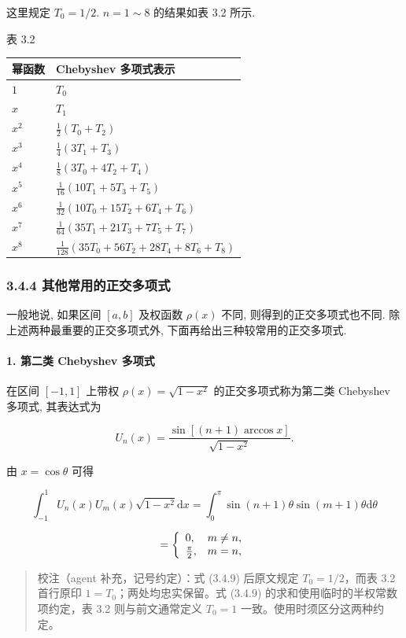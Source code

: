 这里规定 \(T_0 = 1/2\). \(n=1 \sim 8\) 的结果如表 3.2 所示.

表 3.2

{\def\LTcaptype{none} %
\begin{longtable}[]{@{}ll@{}}
\toprule\noalign{}
幂函数 & Chebyshev 多项式表示 \\
\midrule\noalign{}
\endhead
\bottomrule\noalign{}
\endlastfoot
\(1\) & \(T_0\) \\
\(x\) & \(T_1\) \\
\(x^2\) & \(\frac12(T_0+T_2)\) \\
\(x^3\) & \(\frac14(3T_1+T_3)\) \\
\(x^4\) & \(\frac18(3T_0+4T_2+T_4)\) \\
\(x^5\) & \(\frac1{16}(10T_1+5T_3+T_5)\) \\
\(x^6\) & \(\frac1{32}(10T_0+15T_2+6T_4+T_6)\) \\
\(x^7\) & \(\frac1{64}(35T_1+21T_3+7T_5+T_7)\) \\
\(x^8\) & \(\frac1{128}(35T_0+56T_2+28T_4+8T_6+T_8)\) \\
\end{longtable}
}

\subsubsection{3.4.4 其他常用的正交多项式}\label{ch03a-ux5176ux4ed6ux5e38ux7528ux7684ux6b63ux4ea4ux591aux9879ux5f0f}

一般地说, 如果区间 \([a,b]\) 及权函数 \(\rho(x)\) 不同, 则得到的正交多项式也不同. 除上述两种最重要的正交多项式外, 下面再给出三种较常用的正交多项式.

\paragraph{1. 第二类 Chebyshev 多项式}\label{ch03a-ux7b2cux4e8cux7c7b-chebyshev-ux591aux9879ux5f0f}

在区间 \([-1,1]\) 上带权 \(\rho(x) = \sqrt{1-x^2}\) 的正交多项式称为第二类 Chebyshev 多项式, 其表达式为

\[
U_n(x) = \frac{\sin[(n+1)\arccos x]}{\sqrt{1-x^2}}. \tag{3.4.10}
\]

由 \(x=\cos\theta\) 可得

\[
\int_{-1}^{1} U_n(x) U_m(x) \sqrt{1-x^2} \mathrm{d}x = \int_{0}^{\pi} \sin(n+1)\theta \sin(m+1)\theta \mathrm{d}\theta
\]

\[
= \left\{ \begin{array}{l l} 0, & m \neq n, \\ \frac{\pi}{2}, & m=n, \end{array} \right.
\]

\begin{quote}
校注（agent 补充，记号约定）：式 (3.4.9) 后原文规定 \(T_0=1/2\)，而表 3.2 首行原印 \(1=T_0\)；两处均忠实保留。式 (3.4.9) 的求和使用临时的半权常数项约定，表 3.2 则与前文通常定义 \(T_0=1\) 一致。使用时须区分这两种约定。
\end{quote}

